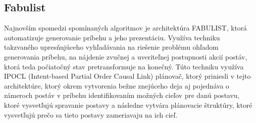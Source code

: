 \subsection{Fabulist}
Najnovším spomedzi spomínaných algoritmov je architektúra FABULIST, ktorá automatizuje generovanie príbehu a jeho prezentáciu. Využíva techniku takzvaného upresňujúceho vyhľadávania na riešenie problému ohľadom generovania príbehu, na nájdenie zvučnej a uveriteľnej postupnosti akcií postáv, ktorá teda počiatočný stav pretransformuje na konečný. Túto techniku využíva IPOCL (Intent-based Partial Order Causal Link) plánovač, ktorý priniesli v tejto architektúre, ktorý okrem vytvorenia bežne znejúceho deja aj pojednáva o zámeroch postáv v príbehu identifikovaním možných cieľov pre danú postavu, ktoré vysvetľujú spravanie postavy a následne vytvára plánovacie štruktúry, ktoré vysvetľujú prečo sa tieto postavy zameriavaju na ich cieľ.
